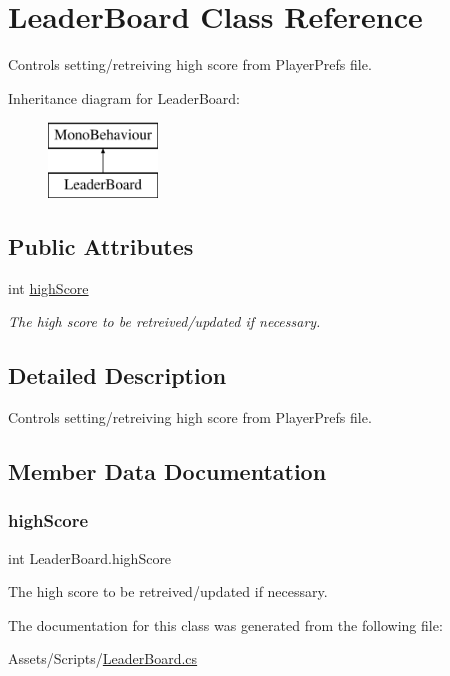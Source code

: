 \hypertarget{class_leader_board}{}\section{Leader\+Board Class Reference}
\label{class_leader_board}


Controls setting/retreiving high score from Player\+Prefs file.  


Inheritance diagram for Leader\+Board\+:\begin{figure}[H]
\begin{center}
\leavevmode
\includegraphics[height=2.000000cm]{class_leader_board}
\end{center}
\end{figure}
\subsection*{Public Attributes}
\begin{DoxyCompactItemize}
\item 
int \mbox{\hyperlink{class_leader_board_a20ea9d21b8e7f2c9138f69f1b074d8a0}{high\+Score}}
\begin{DoxyCompactList}\small\item\em The high score to be retreived/updated if necessary. \end{DoxyCompactList}\end{DoxyCompactItemize}


\subsection{Detailed Description}
Controls setting/retreiving high score from Player\+Prefs file. 

\subsection{Member Data Documentation}
\mbox{\label{class_leader_board_a20ea9d21b8e7f2c9138f69f1b074d8a0}} 
\subsubsection{\texorpdfstring{highScore}{highScore}}
{\footnotesize\ttfamily int Leader\+Board.\+high\+Score}



The high score to be retreived/updated if necessary. 



The documentation for this class was generated from the following file\+:\begin{DoxyCompactItemize}
\item 
Assets/\+Scripts/\mbox{\hyperlink{_leader_board_8cs}{Leader\+Board.\+cs}}\end{DoxyCompactItemize}
